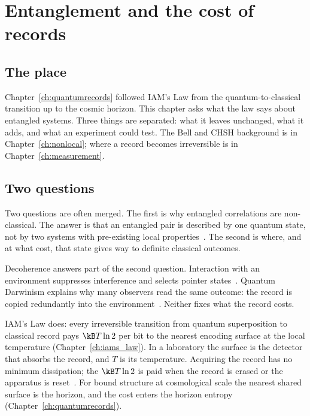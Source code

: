 \chapter{Entanglement and the cost of records}\label{ch:entanglement}

\section*{The place}
Chapter~\ref{ch:quantumrecords} followed IAM's Law from the quantum-to-classical transition up to the cosmic horizon. This chapter asks what the law
says about entangled systems. Three things are separated: what it leaves unchanged, what it adds, and what an experiment could test. The Bell and
CHSH background is in Chapter~\ref{ch:nonlocal}; where a record becomes irreversible is in Chapter~\ref{ch:measurement}.

\section{Two questions}\label{sec:ent:two}
Two questions are often merged. The first is why entangled correlations are non-classical. The answer is that an entangled pair is described by one
quantum state, not by two systems with pre-existing local properties~\cite{Bell1964}. The second is where, and at what cost, that state gives way to
definite classical outcomes.

Decoherence answers part of the second question. Interaction with an environment suppresses interference and selects pointer
states~\cite{Zurek1981,JoosZeh1985,Zurek2003}. Quantum Darwinism explains why many observers read the same outcome: the record is copied redundantly
into the environment~\cite{Zurek2009}. Neither fixes what the record costs.

IAM's Law does: every irreversible transition from quantum superposition to classical record pays $\kB T\ln2$ per bit to the nearest encoding
surface at the local temperature (Chapter~\ref{ch:iams_law}). In a laboratory the surface is the detector that absorbs the record, and $T$ is its
temperature. Acquiring the record has no minimum dissipation; the $\kB T\ln2$ is paid when the record is erased or the apparatus is
reset~\cite{Landauer1961,Bennett1982}. For bound structure at cosmological scale the nearest shared surface is the horizon, and the cost enters the
horizon entropy (Chapter~\ref{ch:quantumrecords}).

